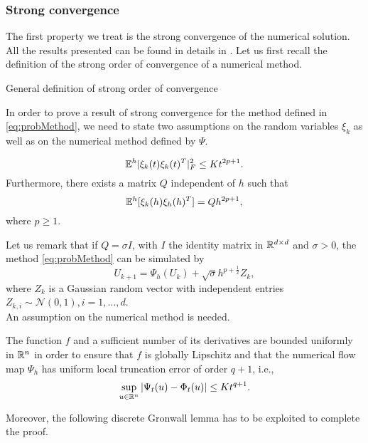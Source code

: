 \subsubsection{Strong convergence}

The first property we treat is the strong convergence of the numerical solution. All the results presented can be found in details in \cite{CGS16}. Let us first recall the definition of the strong order of convergence of a numerical method. 
\begin{definition} General definition of strong order of convergence
\end{definition}
\noindent In order to prove a result of strong convergence for the method defined in \eqref{eq:probMethod}, we need to state two assumptions on the random variables $\xi_k$ as well as on the numerical method defined by $\Psi$. 
\begin{assumption}\label{assumption_1}
\begin{equation}
	\mathbb{E}^h|\xi_k(t)\xi_k(t)^T|^2_F \leq Kt^{2p+1}.
\end{equation}
Furthermore, there exists a matrix $Q$ independent of $h$ such that 
\begin{equation}
	\mathbb{E}^h[\xi_k(h)\xi_h(h)^T] = Qh^{2p+1},
\end{equation}
where $p\geq 1$.
\end{assumption}
\noindent Let us remark that if $Q = \sigma I$, with $I$ the identity matrix in $\mathbb{R}^{d\times d}$ and $\sigma > 0$, the method \eqref{eq:probMethod} can be simulated by
\begin{equation}
	U_{k+1} = \Psi_h(U_k) + \sqrt{\sigma} h^{p + \frac{1}{2}} Z_k,
\end{equation}
where $Z_k$ is a Gaussian random vector with independent entries $Z_{k,i}  \sim\mathcal{N}(0,1), i = 1, \ldots, d$. \\
An assumption on the numerical method is needed.
\begin{assumption}\label{assumption_2}  The function $f$ and a sufficient number of its derivatives are bounded uniformly in $\mathbb{R}^n$ in order to ensure that $f$ is globally Lipschitz and that the numerical flow map $\Psi_h$ has uniform local truncation error of order $q + 1$, i.e., 
\begin{equation}
	\sup_{u\in\mathbb{R}^n} |\Psi_t(u) - \Phi_t(u)| \leq Kt^{q+1}.
\end{equation}
\end{assumption}
\noindent Moreover, the following discrete Gronwall lemma has to be exploited to complete the proof. 
